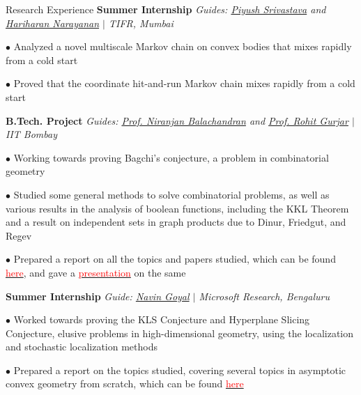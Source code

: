 
\begin{rubric}{Research Experience}
    \entry*[2022] \textbf{Summer Internship} \hfill \emph{Guides: \href{https://www.tifr.res.in/~piyush.srivastava/}{Piyush Srivastava} and \href{https://www.tifr.res.in/~hariharan.narayanan/}{Hariharan Narayanan} $\mid$ TIFR, Mumbai}

        $\bullet$ Analyzed a novel multiscale Markov chain on convex bodies that mixes rapidly from a cold start

        $\bullet$ Proved that the coordinate hit-and-run Markov chain mixes rapidly from a cold start


    \entry*[\phantom{.}2022] \textbf{B.Tech. Project} \hfill \emph{Guides: \href{https://homepages.iitb.ac.in/~niranj/}{Prof. Niranjan Balachandran} and \href{https://www.cse.iitb.ac.in/~rgurjar/}{Prof. Rohit Gurjar} $\mid$ IIT Bombay}

        $\bullet$ Working towards proving Bagchi's conjecture, a problem in combinatorial geometry

        $\bullet$ Studied some general methods to solve combinatorial problems, as well as various results in the analysis of boolean functions, including the KKL Theorem and a result on independent sets in graph products due to Dinur, Friedgut, and Regev

        $\bullet$ Prepared a report on all the topics and papers studied, which can be found \href{https://amitrajaraman.github.io/research/pls/btp1-report.pdf}{\textcolor{red}{here}}, and gave a \href{https://amitrajaraman.github.io/research/pls/btp-presentation.pdf}{\textcolor{red}{presentation}} on the same
    
    \entry*[2021] \textbf{Summer Internship} \hfill \emph{Guide: \href{https://www.microsoft.com/en-us/research/people/navingo/}{Navin Goyal} $\mid$ Microsoft Research, Bengaluru}
        
        $\bullet$ Worked towards proving the KLS Conjecture and Hyperplane Slicing Conjecture, elusive problems in high-dimensional geometry, using the localization and stochastic localization methods

        $\bullet$ Prepared a report on the topics studied, covering several topics in asymptotic convex geometry from scratch, which can be found \href{https://amitrajaraman.github.io/notes/convex-geometry/main.pdf}{\textcolor{red}{here}}

\end{rubric}